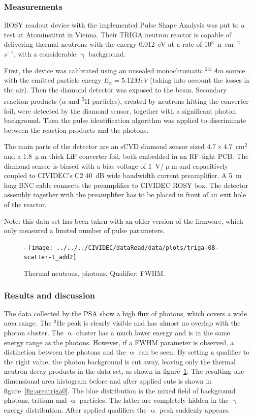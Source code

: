 \subsubsection{Measurements}
ROSY readout device with the implemented Pulse Shape Analysis was put to a test at Atominstitut in Vienna. Their TRIGA neutron reactor is capable of delivering thermal neutrons with the energy 0.012~eV at a rate of 10$^3$~n~cm$^{-2}$ $s^{-1}$, with a considerable $\upgamma$ background. 

First, the device was calibrated using an unsealed monochromatic $^{241}Am$ source with the emitted particle energy $E_\alpha=5.12MeV$ (taking into account the losses in the air). Then the diamond detector was exposed to the beam. Secondary reaction products ($\alpha$ and \textsuperscript{3}H particles), created by neutrons hitting the converter foil, were detected by the diamond sensor, together with a significant photon background. Then the pulse identification algorithm was applied to discriminate between the reaction products and the photons.

The main parts of the detector are an sCVD diamond sensor sized $4.7\times4.7$~cm$^2$ and a $1.8~\upmu$m thick LiF converter foil, both embedded in an RF-tight PCB. The diamond sensor is biased with a bias voltage of 1~V/$\upmu$m  and capacitively coupled to CIVIDEC's C2 40~dB wide bandwidth current preamplifier. A 5~m long BNC cable connects the preamplifier to CIVIDEC ROSY box. The detector assembly together with the preamplifier has to be placed in front of an exit hole of the reactor.

Note: this data set has been taken with an older version of the firmware, which only measured a limited number of pulse parameters.

\begin{figure}[]
\centering-
\texttt{[image: ../../../CIVIDEC/dataRead/data/plots/triga-08-scatter-1\_add2]}
\caption{Thermal neutrons, photons. Qualifier: FWHM.}
\label{fig:scattertriga1}
\end{figure}

\subsubsection{Results and discussion}
The data collected by the PSA show a high flux of photons, which covers a wide area range. The $^3$He peak is clearly visible and has almost no overlap with the photon cluster. The $\upalpha$ cluster has a much lower energy and is in the same energy range as the photons. However, if a FWHM parameter is observed, a distinction between the photons and the $\upalpha$ can be seen. By setting a qualifier to the right value, the photon background is cut away, leaving only the thermal neutron decay products in the data set, as shown in figure~\ref{fig:scattertriga1}. The resulting one-dimensional area histogram before and after applied cuts is shown in figure~\ref{fig:areatriga0}. The blue distribution is the mixed field of background photons, tritium and $\upalpha$ particles. The latter are completely hidden in the $\upgamma$ energy distribution. After applied qualifiers the $\upalpha$ peak suddenly appears.


